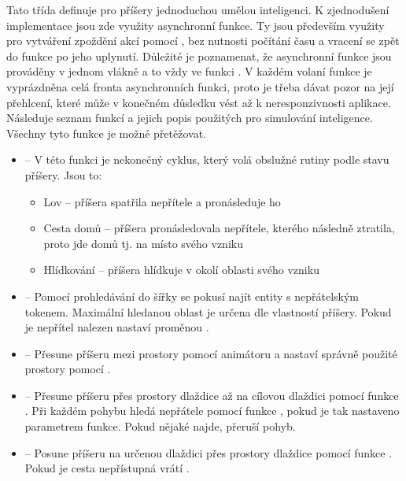 Tato třída definuje pro příšery jednoduchou umělou inteligenci. K zjednodušení implementace jsou zde využity 
asynchronní funkce. Ty jsou především využity pro vytváření zpoždění akcí pomocí , bez nutnosti počítání času a vracení se zpět
do funkce po jeho uplynutí. Důležité je poznamenat, že asynchronní funkce jsou prováděny v jednom vlákně a to vždy ve funkci . V každém volaní funkce
je vyprázdněna celá fronta asynchronních funkci, proto je třeba dávat pozor na její přehlcení, které může v konečném důsledku vést až k neresponzivnosti aplikace.
Následuje seznam funkcí a jejich popis použitých pro simulování inteligence. Všechny tyto funkce je možné přetěžovat.
\begin{itemize}

\item {} -- V této funkci je nekonečný cyklus, který volá obslužné rutiny podle stavu příšery. Jsou to:
	\begin{itemize}
    \item Lov -- příšera spatřila nepřítele a pronásleduje ho 
    \item Cesta domů -- příšera pronásledovala nepřítele, kterého následně ztratila, proto jde domů tj. na místo svého vzniku
    \item Hlídkování -- příšera hlídkuje v okolí oblasti svého vzniku
	\end{itemize}

\item {} -- Pomocí prohledávání do šířky se pokusí najít entity s nepřátelským tokenem. Maximální hledanou oblast
je určena dle vlastností příšery. Pokud je nepřítel nalezen nastaví proměnou .

\item {} -- Přesune příšeru mezi prostory pomocí animátoru a nastaví správně použité prostory pomocí .

\item {} -- Přesune příšeru přes prostory dlaždice až na cílovou dlaždici pomocí funkce . Při každém pohybu hledá nepřátele
pomocí funkce , pokud je tak nastaveno parametrem funkce. Pokud nějaké najde, přeruší pohyb.

\item {} -- Posune příšeru na určenou dlaždici přes prostory dlaždice pomocí funkce .
 Pokud je cesta nepřístupná vrátí .


\end{itemize}
